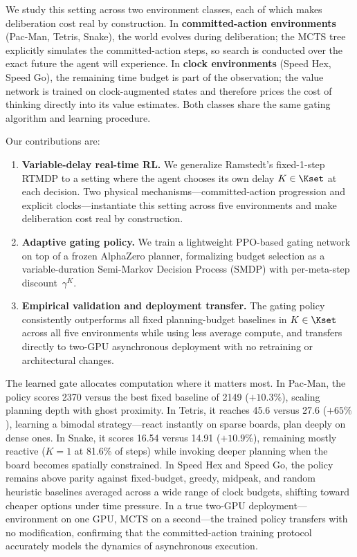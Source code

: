 We study this setting across two environment classes, each of which makes
deliberation cost real by construction.
In \textbf{committed-action environments} (Pac-Man, Tetris, Snake), the
world evolves during deliberation; the MCTS tree explicitly simulates the
committed-action steps, so search is conducted over the exact future the
agent will experience.
In \textbf{clock environments} (Speed Hex, Speed Go), the remaining time
budget is part of the observation; the value network is trained on
clock-augmented states and therefore prices the cost of thinking directly
into its value estimates.
Both classes share the same gating algorithm and learning procedure.

Our contributions are:
\begin{enumerate}
  \item \textbf{Variable-delay real-time RL.}
    We generalize Ramstedt's fixed-1-step RTMDP to a setting where the agent
    chooses its own delay $K \in \Kset$ at each decision.
    Two physical mechanisms—committed-action progression and explicit
    clocks—instantiate this setting across five environments and make
    deliberation cost real by construction.
  \item \textbf{Adaptive gating policy.}
    We train a lightweight PPO-based gating network on top of a frozen
    AlphaZero planner, formalizing budget selection as a variable-duration
    Semi-Markov Decision Process (SMDP) with per-meta-step
    discount~$\gamma^K$.
  \item \textbf{Empirical validation and deployment transfer.}
    The gating policy consistently outperforms all fixed planning-budget
    baselines in $K \in \Kset$ across all five environments while using less
    average compute, and transfers directly to two-GPU asynchronous
    deployment with no retraining or architectural changes.
\end{enumerate}

The learned gate allocates computation where it matters most.
In Pac-Man, the policy scores 2370 versus the best fixed baseline of
2149 ($+10.3\%$), scaling planning depth with ghost proximity.
In Tetris, it reaches 45.6 versus 27.6 ($+65\%$), learning a bimodal
strategy—react instantly on sparse boards, plan deeply on dense ones.
In Snake, it scores 16.54 versus 14.91 ($+10.9\%$), remaining mostly reactive
($K{=}1$ at 81.6\% of steps) while invoking deeper planning when the board
becomes spatially constrained.
In Speed Hex and Speed Go, the policy remains above parity against
fixed-budget, greedy, midpeak, and random heuristic baselines averaged
across a wide range of clock budgets, shifting toward cheaper options under
time pressure.
In a true two-GPU deployment—environment on one GPU, MCTS on a second—the
trained policy transfers with no modification, confirming that the
committed-action training protocol accurately models the dynamics of
asynchronous execution.

